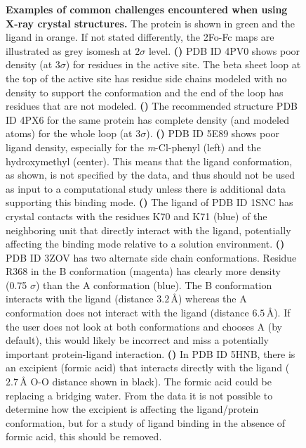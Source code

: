 \documentclass[9pt,bestpractices]{livecoms}
\begin{document}
\begin{figure}
    \caption{
    \textbf{Examples of common challenges encountered when using X-ray crystal structures.}
    The protein is shown in green and the ligand in orange. If not stated differently, the 2Fo-Fc maps are illustrated as grey isomesh at $2\sigma$ level. 
    \textbf{()} PDB ID 4PV0  shows poor density (at $3\sigma$) for residues in the active site.  The beta sheet loop at the top of the active site has residue side chains modeled with no density to support the conformation and the end of the loop has residues that are not modeled.
    \textbf{()} The recommended structure PDB ID 4PX6 for the same protein  has complete density (and modeled atoms) for the whole loop (at $3\sigma$).
    \textbf{()} PDB ID 5E89 shows poor ligand density, especially for the \textit{m}-Cl-phenyl (left) and the hydroxymethyl (center). This means that the ligand conformation, as shown, is not specified by the data, and thus should not be used as input to a computational study unless there is additional data supporting this binding mode.
    \textbf{()} The ligand of PDB ID 1SNC has crystal contacts with the residues K70 and K71 (blue) of the neighboring unit that directly interact with the ligand, potentially affecting the binding mode relative to a solution environment.
    \textbf{()} PDB ID 3ZOV has two
    alternate side chain conformations. Residue R368 in the B conformation (magenta) has clearly more density (0.75 $\sigma$) than the A conformation (blue). The B conformation interacts with the ligand (distance $3.2\,$\AA{}) whereas the A conformation does not interact with the ligand (distance $6.5\,$\AA{}). If the user does not look at both conformations and chooses A (by default), this would likely be incorrect and miss a potentially important protein-ligand interaction.  
    \textbf{()} In PDB ID 5HNB, there is an excipient (formic acid) that interacts directly with the ligand ($2.7\,$\AA{} O-O distance shown in black).  The formic acid could be replacing a bridging water.  From the data it is not possible to determine how the excipient is affecting the ligand/protein conformation, but for a study of ligand binding in the absence of formic acid, this should be removed.
    }
    \label{fig:crystal1}
\end{figure}
\end{document}
